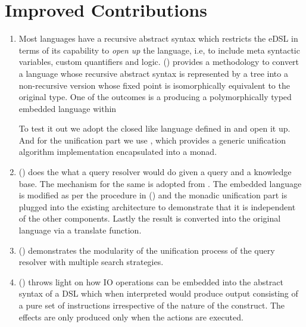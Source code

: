 \documentclass[thesis-solanki.tex]{subfiles}
\begin{document}
\section{Improved Contributions}
\begin{enumerate}
\item
  Most languages have a recursive abstract syntax which restricts the eDSL in terms of its capability to
  \textit{open up} the language{\large,} i.e{\large,}
  to include meta syntactic variables, custom quantifiers and logic.
  () provides a methodology to convert a language whose recursive abstract
  syntax is represented by a tree into a non-recursive version whose fixed point is isomorphically equivalent to
  the original type.
  One of the outcomes is a producing a polymorphically typed embedded language within 

  To test it out we adopt the closed  like language defined in \cite{prolog-lib} and open it up.
  And for the unification part we use \cite{unification-fd-lib}, which provides a generic unification algorithm
  implementation encapsulated into a monad.

\item
  () does the what a  query resolver would do given a
  query and a knowledge base.
  The mechanism for the same is adopted from \cite{prolog-lib}.
  The embedded language is modified as per the procedure in () and the
  monadic unification part is plugged into the existing architecture to demonstrate that it is independent of the
  other components.
  Lastly the result is converted into the original language via a translate function.

\item
  () demonstrates the modularity of the unification process of the query
  resolver with multiple search strategies.

\item
  () throws light on how IO operations can be embedded into the abstract
  syntax of a DSL which when interpreted would produce output consisting of a pure set of instructions irrespective
  of the nature of the construct.
  The effects are only produced only when the actions are executed.
\end{enumerate}
\end{document}

